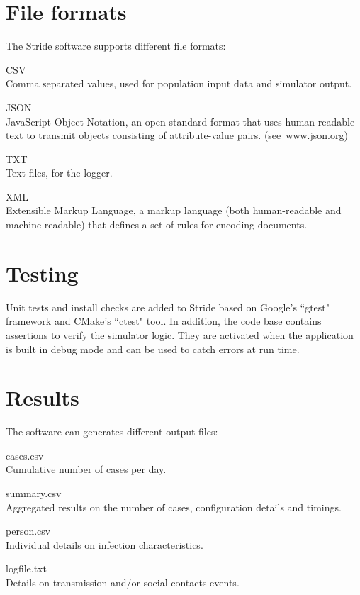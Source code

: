 \section{File formats}
\label{section:FileFormats}

The Stride software supports different file formats:
\begin{compactdesc}
	\item [CSV] \ \\
	Comma separated values, used for population input data and simulator output.
	\item [JSON] \ \\
	JavaScript Object Notation, an open standard format that uses human-readable text to transmit objects consisting of attribute-value pairs. 	 \mbox{(see \url{www.json.org})}
	\item [TXT] \ \\
	Text files, for the logger.
	\item [XML] \ \\
	Extensible Markup Language, a markup language (both human-readable and machine-readable) that defines a set of rules for encoding documents.
\end{compactdesc}


%
\section{Testing}
Unit tests and install checks are added to Stride based on Google's ``gtest" framework and CMake's ``ctest" tool.
In addition, the code base contains assertions to verify the simulator logic.
They are activated when the application is built in debug mode and can be used to catch errors at run time.


\section{Results}
\label{section:Results}

The software can generates different output files:
\begin{compactdesc}
	\item [cases.csv] \ \\
	Cumulative number of cases per day.
	\item [summary.csv] \ \\
	Aggregated results on the number of cases, configuration details and timings.
	\item [person.csv] \ \\
	Individual details on infection characteristics.
	\item [logfile.txt] \ \\
	Details on transmission and/or social contacts events.
\end{compactdesc}


